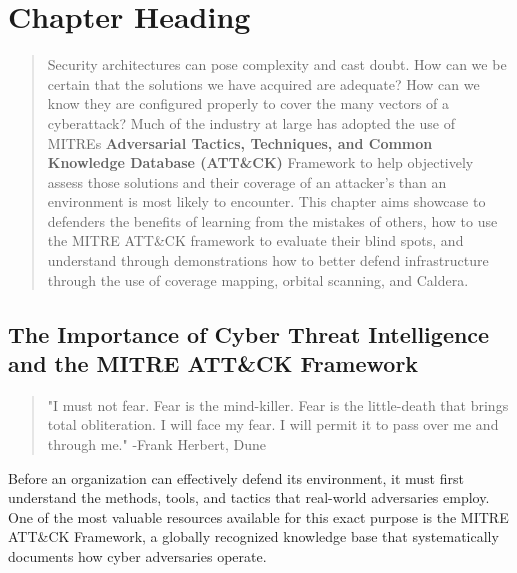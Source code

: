 %
%
%
\chapter{Chapter Heading}
\label{intro} %

\begin{abstract}
Security architectures can pose complexity and cast doubt. How can we be certain that the solutions we have acquired are adequate? How can we know they are configured properly to cover the many vectors of a cyberattack? Much of the industry at large has adopted the use of MITREs \textbf{Adversarial Tactics, Techniques, and Common Knowledge Database (ATT\&CK)} Framework to help objectively assess those solutions and their coverage of an attacker's than an environment is most likely to encounter. This chapter aims showcase to defenders the benefits of learning from the mistakes of others, how to use the MITRE ATT\&CK framework to evaluate their blind spots, and understand through demonstrations how to better defend infrastructure through the use of coverage mapping, orbital scanning, and Caldera.
\end{abstract}

\section{The Importance of Cyber Threat Intelligence and the MITRE ATT\&CK Framework}

\begin{quote}
    "I must not fear. Fear is the mind-killer. Fear is the little-death that brings total obliteration. I will face my fear. I will permit it to pass over me and through me."
    -Frank Herbert, Dune
\end{quote}
Before an organization can effectively defend its environment, it must first understand the methods, tools, and tactics that real-world adversaries employ. One of the most valuable resources available for this exact purpose is the MITRE ATT\&CK Framework, a globally recognized knowledge base that systematically documents how cyber adversaries operate.

